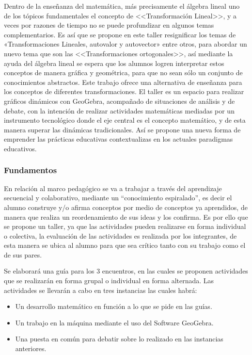 Dentro de la enseñanza del matemática, más precisamente el álgebra lineal uno de los tópicos fundamentales el concepto de <<Transformación Lineal>>, y a veces por razones de tiempo no se puede profundizar en algunos temas complementarios. Es así que se propone en este taller resignificar los temas de «Transformaciones Lineales, autovalor y autovector» entre otros, para abordar un nuevo tema que son las <<Transformaciones ortogonales>>, así mediante la ayuda del álgebra lineal se espera que los alumnos logren interpretar estos conceptos de manera gráfica y geométrica, para que no sean sólo un conjunto de conocimientos abstractos. Este trabajo ofrece una alternativa de enseñanza para los conceptos de diferentes transformaciones. El taller es un espacio para realizar gráficos dinámicos con GeoGebra, acompañado de situaciones de análisis y de debate, con la intención de realizar actividades matemáticas mediadas por un instrumento tecnológico donde el eje central es el concepto matemático, y de esta manera superar las dinámicas tradicionales. Así se propone una nueva forma de emprender las prácticas educativas contextualizas en los actuales paradigmas educativos.

\subsubsection{Fundamentos}

En relación al marco pedagógico se va a trabajar a través del aprendizaje secuencial y colaborativo, mediante un “conocimiento espiralado”, es decir el alumno construye y/o afirma conceptos por medio de conceptos ya aprendidos, de manera que realiza un reordenamiento de sus ideas y los confirma. Es por ello que se propone un taller, ya que las actividades pueden realizarse en forma individual o colectiva, la evaluación de las actividades es realizada por los integrantes, de esta manera se ubica al alumno para que sea crítico tanto con su trabajo como el de sus pares. 

Se elaborará una guía para los 3 encuentros, en las cuales se proponen actividades que se realizarán en forma grupal o individual en forma alternada. Las actividades se llevarán a cabo en tres instancias las cuales habrá:
\begin{itemize}
	\item Un desarrollo matemático en función a lo que se pide en las guías.
	\item Un trabajo en la máquina mediante el uso del Software GeoGebra.
	\item Una puesta en común para debatir sobre lo realizado en las instancias anteriores.
\end{itemize}

